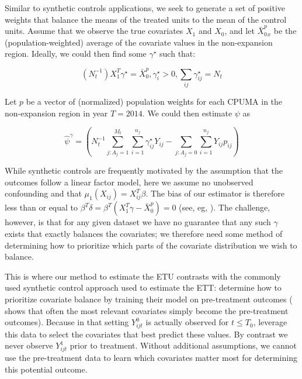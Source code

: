 \documentclass[12pt]{article}
\begin{document}
Similar to synthetic controls applications, we seek to generate a set of positive weights that balance the means of the treated units to the mean of the control units. Assume that we observe the true covariates $X_1$ and $X_0$, and let $\bar{X}_0^p_x$ be the (population-weighted) average of the covariate values in the non-expansion region. Ideally, we could then find some $\gamma^\star$ such that: 

$$
(N_t^{-1})X_1^T\gamma^\star = \bar{X}_0^p, \gamma_i^\star > 0, \sum_{ij} \gamma_{ij}^\star = N_t
$$

Let $p$ be a vector of (normalized) population weights for each CPUMA in the non-expansion region in year $T = 2014$. We could then estimate $\psi$ as

$$
\hat{\psi}^{\gamma} = (N_t^{-1}\sum_{j: A_j = 1}^{M_t}\sum_{i = 1}^{n_j}\gamma_{ij}^\star Y_{ij} - \sum_{j: A_j = 0}\sum_{i = 1}^{n_j}Y_{ij}p_{ij})
$$

While synthetic controls are frequently motivated by the assumption that the outcomes follow a linear factor model, here we assume no unobserved confounding and that $\mu_1(X_{ij}) = X_{ij}^T\beta$. The bias of our estimator is therefore less than or equal to $\beta^T \delta = \beta^T(X_1^T\gamma - \bar{X}_0^p) = 0$ (see, eg, \cite{zubizarreta2015stable}). The challenge, however, is that for any given dataset we have no guarantee that any such $\gamma$ exists that exactly balances the covariates; we therefore need some method of determining how to prioritize which parts of the covariate distribution we wish to balance.

This is where our method to estimate the ETU contrasts with the commonly used synthetic control approach used to estimate the ETT: \cite{abadie2010synthetic} determine how to prioritize covariate balance by training their model on pre-treatment outcomes (\cite{kaul2015synthetic} shows that often the most relevant covariates simply become the pre-treatment outcomes). Because in that setting $Y^0_{ijt}$ is actually observed for $t \le T_0$, \cite{abadie2010synthetic} leverage this data to select the covariates that best predict these values. By contrast we never observe $Y^1_{ijt}$ prior to treatment. Without additional assumptions, we cannot use the pre-treatment data to learn which covariates matter most for determining this potential outcome.
\end{document}
